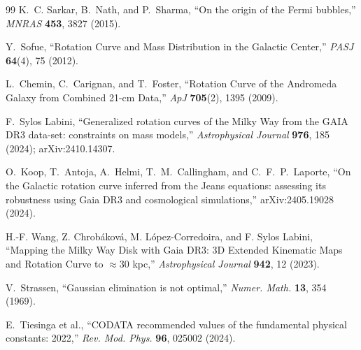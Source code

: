 \documentclass[11pt,a4paper]{article}
\begin{document}
\begin{thebibliography}{99}
K.~C. Sarkar, B.~Nath, and P.~Sharma,
``On the origin of the Fermi bubbles,''
\textit{MNRAS} \textbf{453}, 3827 (2015).

Y.~Sofue,
``Rotation Curve and Mass Distribution in the Galactic Center,''
\textit{PASJ} \textbf{64}(4), 75 (2012).

L.~Chemin, C.~Carignan, and T.~Foster,
``Rotation Curve of the Andromeda Galaxy from Combined 21-cm Data,''
\textit{ApJ} \textbf{705}(2), 1395 (2009).

F.~Sylos Labini,
``Generalized rotation curves of the Milky Way from the GAIA DR3 data-set:
constraints on mass models,''
\textit{Astrophysical Journal} \textbf{976}, 185 (2024); arXiv:2410.14307.

O.~Koop, T.~Antoja, A.~Helmi, T.~M.~Callingham, and C.~F.~P.~Laporte,
``On the Galactic rotation curve inferred from the Jeans equations: assessing
its robustness using Gaia DR3 and cosmological simulations,''
arXiv:2405.19028 (2024).

H.-F. Wang, Z. Chrob\'akov\'a, M. L\'opez-Corredoira, and F. Sylos Labini,
``Mapping the Milky Way Disk with Gaia DR3: 3D Extended Kinematic Maps and
Rotation Curve to $\approx30$ kpc,''
\textit{Astrophysical Journal} \textbf{942}, 12 (2023).

V.~Strassen,
``Gaussian elimination is not optimal,''
\textit{Numer. Math.} \textbf{13}, 354 (1969).

E.~Tiesinga et al.,
``CODATA recommended values of the fundamental physical constants: 2022,''
\textit{Rev. Mod. Phys.} \textbf{96}, 025002 (2024).

\end{thebibliography}
\end{document}
